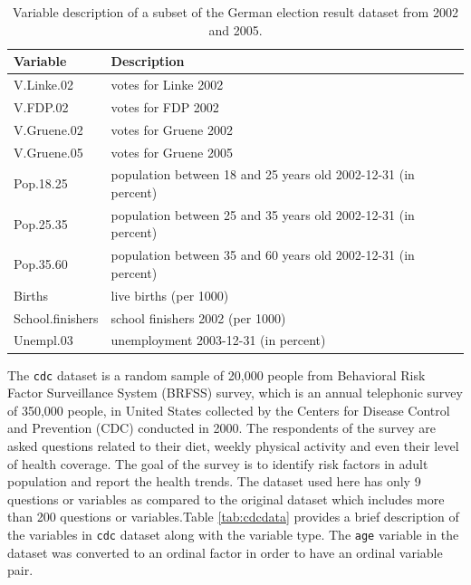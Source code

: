 \begin{Schunk}
\begin{table}

\caption{\label{tab:germanelection}Variable description of a subset of the German election result dataset from 2002 and 2005.}
\centering
\begin{tabular}[t]{ll}
\toprule
Variable & Description\\
\midrule
V.Linke.02 & votes for Linke 2002\\
V.FDP.02 & votes for FDP 2002\\
V.Gruene.02 & votes for Gruene 2002\\
V.Gruene.05 & votes for Gruene 2005\\
Pop.18.25 & population between 18 and 25 years old 2002-12-31 (in percent)\\
\addlinespace
Pop.25.35 & population between 25 and 35 years old 2002-12-31 (in percent)\\
Pop.35.60 & population between 35 and 60 years old 2002-12-31 (in percent)\\
Births & live births (per 1000)\\
School.finishers & school finishers 2002 (per 1000)\\
Unempl.03 & unemployment 2003-12-31 (in percent)\\
\bottomrule
\end{tabular}
\end{table}

\end{Schunk}

The \texttt{cdc} dataset is a random sample of 20,000 people from
Behavioral Risk Factor Surveillance System (BRFSS) survey, which is an
annual telephonic survey of 350,000 people, in United States collected
by the Centers for Disease Control and Prevention (CDC) conducted in
2000. The respondents of the survey are asked questions related to their
diet, weekly physical activity and even their level of health coverage.
The goal of the survey is to identify risk factors in adult population
and report the health trends. The dataset used here has only 9 questions
or variables as compared to the original dataset which includes more
than 200 questions or variables.Table \ref{tab:cdcdata} provides a brief
description of the variables in \texttt{cdc} dataset along with the
variable type. The \texttt{age} variable in the dataset was converted to
an ordinal factor in order to have an ordinal variable pair.

